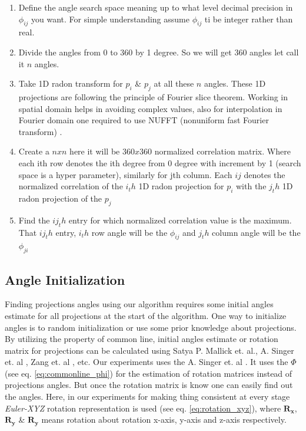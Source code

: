 \documentclass{report}
\begin{document}
\begin{enumerate}
    \item Define the angle search space meaning up to what level decimal precision in ${\phi_{ij}}$ you want. For simple understanding assume ${\phi_{ij}}$ ti be integer rather than real. 
    \item Divide the angles from 0 to 360 by 1 degree. So we will get 360 angles let call it ${n}$ angles.
    \item Take 1D radon transform for ${p_i}$ \& ${p_j}$ at all these ${n}$ angles. These 1D projections are following the principle of Fourier slice theorem. Working in spatial domain helps in avoiding complex values, also for interpolation in Fourier domain one required to use NUFFT (nonuniform fast Fourier transform) \cite{fessler2003NUFFT}.
    
    \item Create a ${nxn}$ here it will be ${360x360}$ normalized correlation  matrix. Where each ith row denotes the ith degree from 0 degree with increment by 1 (search space is a hyper parameter), similarly for jth column. Each $ij$ denotes the normalized correlation of the ${i_th}$ 1D radon projection for ${p_i}$  with the ${j_th}$ 1D  radon projection of the ${p_j}$   
    
    \item Find the $ij_th$ entry for which normalized correlation value is the maximum. That  $ij_th$ entry, ${i_th}$ row angle will be the $\phi_{ij}$ and ${j_th}$ column angle will be the $\phi_{ji}$
\end{enumerate}

\subsection{Angle Initialization}\label{subsec: angle_initialization}
Finding projections angles using our algorithm requires some initial angles estimate for all projections at the start of the algorithm. One way to initialize angles is to random initialization or use some prior knowledge about projections.\\ 
 
 By utilizing the property of common line, initial angles estimate or rotation matrix for projections can be calculated using Satya P. Mallick et. al.\cite{mallick2006structure}, A. Singer et. al \cite{singer2009threeAngleEstimate} \cite{sigworthcryoAngleEstimate}, Zang et. al \cite{wang2018improvingAngleEstimate}, etc.  Our experiments uses the A. Singer et. al \cite{singer2009threeAngleEstimate}. It uses the ${\Phi}$ (see eq. \ref{eq:commonline_phi}) for the estimation of rotation matrices instead of projections angles. But once the rotation matrix is know one can easily find out the angles. Here, in our experiments for making thing consistent at every stage \textit{Euler-XYZ} rotation representation is used (see eq. \ref{eq:rotation_xyz}), where ${\boldsymbol{R_x}}$, ${\boldsymbol{R_y}}$ \& ${\boldsymbol{R_y}}$ means rotation about rotation x-axis, y-axis and z-axis respectively.
\end{document}
